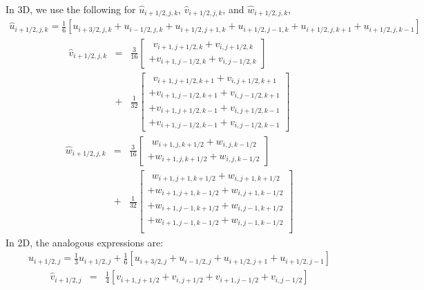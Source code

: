 \documentclass[fleqn,12pt,twoside]{article}
\newcommand{\bea}{\begin{eqnarray}}
\newcommand{\eea}{\end{eqnarray}}
\begin{document}
In 3D, we use the following for
$\hat{u}_{i+1/2,j,k}$, $\hat{v}_{i+1/2,j,k}$, and $\hat{w}_{i+1/2,j,k}$, 
\bea
  \hat{u}_{i+1/2,j,k} = \frac{1}{6}
  \left[
      u_{i+3/2,j,k} + u_{i-1/2,j,k} 
    + u_{i+1/2,j+1,k} + u_{i+1/2,j-1,k} 
    + u_{i+1/2,j,k+1} + u_{i+1/2,j,k-1}
  \right]
\eea
\bea
  \hat{v}_{i+1/2,j,k} &=& 
  \frac{3}{16}
  \left[
    \begin{array}{c}
    \ \ v_{i+1,j+1/2,k} + v_{i,j+1/2,k} \\
    + v_{i+1,j-1/2,k} + v_{i,j-1/2,k}
    \end{array}
  \right] \nonumber \\
  &+& \frac{1}{32}
  \left[
    \begin{array}{c}
    \ \ v_{i+1,j+1/2,k+1} + v_{i,j+1/2,k+1} \\
    + v_{i+1,j-1/2,k+1} + v_{i,j-1/2,k+1} \\
    + v_{i+1,j+1/2,k-1} + v_{i,j+1/2,k-1} \\
    + v_{i+1,j-1/2,k-1} + v_{i,j-1/2,k-1}
    \end{array}
  \right]
\eea
\bea
  \hat{w}_{i+1/2,j,k} &=& 
  \frac{3}{16}
  \left[
    \begin{array}{c}
    \ \ w_{i+1,j,k+1/2} + w_{i,j,k-1/2} \\
    + w_{i+1,j,k+1/2} + w_{i,j,k-1/2}
    \end{array}
  \right] \nonumber \\
  &+& \frac{1}{32}
  \left[
    \begin{array}{c}
    \ \ w_{i+1,j+1,k+1/2} + w_{i,j+1,k+1/2} \\
    + w_{i+1,j+1,k-1/2} + w_{i,j+1,k-1/2} \\
    + w_{i+1,j-1,k+1/2} + w_{i,j-1,k+1/2} \\
    + w_{i+1,j-1,k-1/2} + w_{i,j-1,k-1/2} \\
    \end{array}
  \right]
\eea
In 2D, the analogous expressions are:
\bea
  \hat{u}_{i+1/2,j} = \frac{1}{3} u_{i+1/2,j}
  + \frac{1}{6}
  \left[
      u_{i+3/2,j} + u_{i-1/2,j} 
    + u_{i+1/2,j+1} + u_{i+1/2,j-1} 
  \right]
\eea
\bea
  \hat{v}_{i+1/2,j} &=& 
  \frac{1}{4}
  \left[
      v_{i+1,j+1/2} + v_{i,j+1/2} 
    + v_{i+1,j-1/2} + v_{i,j-1/2}
  \right] 
\eea
\end{document}
